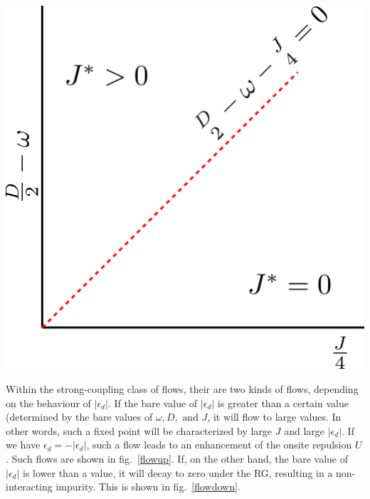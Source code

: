 \documentclass[12pt,twoside]{article}
\numberwithin{equation}{section}
\begin{document}
{\begin{center}
	\label{flows}
\end{center}
\begin{center}
	\includegraphics[scale=0.5]{../figures/siam-kondo-phases.png}
	\label{phases-siam-kondo}
\end{center}
Within the strong-coupling class of flows, their are two kinds of flows, depending on the behaviour of \(|\epsilon_d|\). If the bare value of \(|\epsilon_d|\) is greater than a certain value (determined by the bare values of \(\omega, D, \text{ and }J\), it will flow to large values. In other words, such a fixed point will be characterized by large \(J\) and large \(|\epsilon_d|\). If we have \(\epsilon_d = -|\epsilon_d|\), such a flow leads to an enhancement of the onsite repulsion \(U\). Such flows are shown in fig.~\ref{flowup}.
\pb If, on the other hand, the bare value of \(|\epsilon_d|\) is lower than a value, it will decay to zero under the RG, resulting in a non-interacting impurity. This is shown in fig.~\ref{flowdown}.
\begin{center}

\end{center}}
\end{document}
